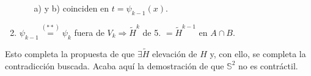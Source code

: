\begin{demo}
\begin{enumerate}
\begin{enumerate}
    \item[a) y b)] coinciden en $t = \psi_{k - 1} \left( x \right)$.
    \end{enumerate}

    \item $\psi_{k - 1} \stackrel{(**)}{=} \psi_k$ fuera de $V_k \Rightarrow \tilde{H}^k$ de 5. $= \tilde{H}^{k - 1}$ en $A \cap B$.
\end{enumerate}

Esto completa la propuesta de que $\exists \tilde{H}$ elevación de $H$ y, con ello, se completa la contradicción buscada. Acaba aquí la demostración de que $\mathbb{S}^{2}$ no es contráctil.
\end{demo}

